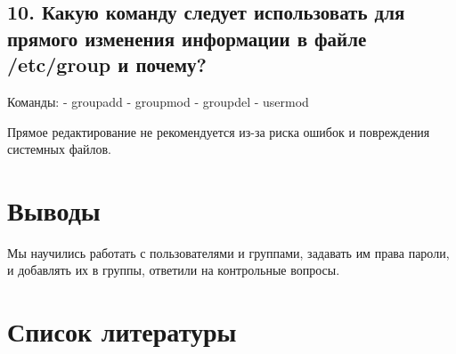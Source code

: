 \documentclass[
  12pt,
  a4paper,
  DIV=11,
  numbers=noendperiod]{scrreprt}
\begin{document}
\section{10. Какую команду следует использовать для прямого изменения
информации в файле /etc/group и
почему?}\label{ux43aux430ux43aux443ux44e-ux43aux43eux43cux430ux43dux434ux443-ux441ux43bux435ux434ux443ux435ux442-ux438ux441ux43fux43eux43bux44cux437ux43eux432ux430ux442ux44c-ux434ux43bux44f-ux43fux440ux44fux43cux43eux433ux43e-ux438ux437ux43cux435ux43dux435ux43dux438ux44f-ux438ux43dux444ux43eux440ux43cux430ux446ux438ux438-ux432-ux444ux430ux439ux43bux435-etcgroup-ux438-ux43fux43eux447ux435ux43cux443}

Команды: - groupadd - groupmod - groupdel - usermod

Прямое редактирование не рекомендуется из-за риска ошибок и повреждения
системных файлов.

\chapter{Выводы}\label{ux432ux44bux432ux43eux434ux44b}

Мы научились работать с пользователями и группами, задавать им права
пароли, и добавлять их в группы, ответили на контрольные вопросы.

\chapter*{Список
литературы}\label{ux441ux43fux438ux441ux43eux43a-ux43bux438ux442ux435ux440ux430ux442ux443ux440ux44b}

\printbibliography[heading=none]
\end{document}
